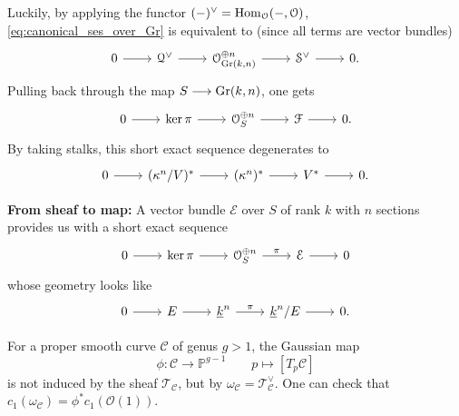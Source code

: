 \begin{remark}
Luckily, by applying the functor $(-)^{\vee}= \operatorname{\operatorname{Hom}}_{\mathcal{O}}(-,\mathcal{O})$, \eqref{eq:canonical_ses_over_Gr} is equivalent to (since all terms are vector bundles)
\begin{equation}\label{eq:canonical_ses_over_Gr_dual}
\begin{tikzcd}[column sep=2.25em]
	0 & {\mathcal{Q}^{\vee}} & {\mathcal{O}_{\Gr(k,n)}^{\oplus n}} & {\mathcal{S}^{\vee}} & 0.
	\arrow[from=1-1, to=1-2]
	\arrow[from=1-2, to=1-3]
	\arrow[from=1-3, to=1-4]
	\arrow[from=1-4, to=1-5]
\end{tikzcd}
\end{equation}
Pulling back through the map $S \longrightarrow \operatorname{Gr}(k,n)$, one gets
\[\begin{tikzcd}[column sep=2.25em]
	0 & {\ker \pi} & {\mathcal{O}_S^{\oplus n}} & {\mathcal{F}} & 0.
	\arrow[from=1-1, to=1-2]
	\arrow[from=1-2, to=1-3]
	\arrow[from=1-3, to=1-4]
	\arrow[from=1-4, to=1-5]
\end{tikzcd}\]
By taking stalks, this short exact sequence degenerates to
\[\begin{tikzcd}[column sep=2.25em]
	0 & {(\kappa^n/V)^*} & {(\kappa^n)^*} & V^* & 0. 
	\arrow[from=1-1, to=1-2]
	\arrow[from=1-2, to=1-3]
	\arrow[from=1-3, to=1-4]
	\arrow[from=1-4, to=1-5]
\end{tikzcd}\]

\textbf{From sheaf to map:} A vector bundle $\mathcal{E}$ over $S$ of rank $k$ with $n$ sections provides us with a short exact sequence 
\[\begin{tikzcd}[column sep=2.25em]
	0 & {\ker \pi} & {\mathcal{O}_S^{\oplus n}} & {\mathcal{E}} & 0
	\arrow[from=1-1, to=1-2]
	\arrow[from=1-2, to=1-3]
	\arrow["\pi", from=1-3, to=1-4]
	\arrow[from=1-4, to=1-5]
\end{tikzcd}\]
whose geometry looks like
\[\begin{tikzcd}[column sep=2.25em]
	0 & {E} & {\underline{k}^n} & {\underline{k}^n/E} & 0.
	\arrow[from=1-1, to=1-2]
	\arrow[from=1-2, to=1-3]
	\arrow["\pi", from=1-3, to=1-4]
	\arrow[from=1-4, to=1-5]
\end{tikzcd}\]
\end{remark}
\begin{eg}
For a proper smooth curve $\mathcal{C}$ of genus $g>1$, the Gaussian map
$$\phi: \mathcal{C} \longrightarrow \mathbb{P}^{g-1} \qquad p \longmapsto [T_p\mathcal{C}]$$
is not induced by the sheaf $\mathcal{T}_{\mathcal{C}}$, but by $\omega_{\mathcal{C}}=\mathcal{T}_{\mathcal{C}}^{\vee}$. One can check that $c_1(\omega_{\mathcal{C}})=\phi^* c_1(\mathcal{O}(1))$.
\end{eg}
